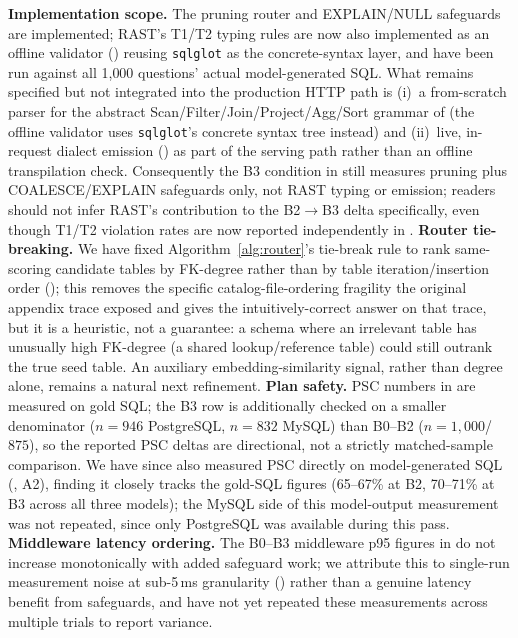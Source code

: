 \documentclass[twocolumn]{svjour3}
\begin{document}
\textbf{Implementation scope.} The pruning router and EXPLAIN/NULL safeguards are implemented; RAST's T1/T2 typing rules are now also implemented as an offline validator () reusing \texttt{sqlglot} as the concrete-syntax layer, and have been run against all 1{,}000 questions' actual model-generated SQL. What remains specified but not integrated into the production HTTP path is (i)~a from-scratch parser for the abstract Scan/Filter/Join/Project/Agg/Sort grammar of  (the offline validator uses \texttt{sqlglot}'s concrete syntax tree instead) and (ii)~live, in-request dialect emission () as part of the serving path rather than an offline transpilation check. Consequently the B3 condition in  still measures pruning plus COALESCE/EXPLAIN safeguards only, not RAST typing or emission; readers should not infer RAST's contribution to the B2$\to$B3 delta specifically, even though T1/T2 violation rates are now reported independently in .
\textbf{Router tie-breaking.} We have fixed Algorithm~\ref{alg:router}'s tie-break rule to rank same-scoring candidate tables by FK-degree rather than by table iteration/insertion order (); this removes the specific catalog-file-ordering fragility the original appendix trace exposed and gives the intuitively-correct answer on that trace, but it is a heuristic, not a guarantee: a schema where an irrelevant table has unusually high FK-degree (a shared lookup/reference table) could still outrank the true seed table. An auxiliary embedding-similarity signal, rather than degree alone, remains a natural next refinement.
\textbf{Plan safety.} PSC numbers in  are measured on gold SQL; the B3 row is additionally checked on a smaller denominator ($n{=}946$ PostgreSQL, $n{=}832$ MySQL) than B0--B2 ($n{=}1{,}000$/$875$), so the reported PSC deltas are directional, not a strictly matched-sample comparison. We have since also measured PSC directly on model-generated SQL (, A2), finding it closely tracks the gold-SQL figures (65--67\% at B2, 70--71\% at B3 across all three models); the MySQL side of this model-output measurement was not repeated, since only PostgreSQL was available during this pass.
\textbf{Middleware latency ordering.} The B0--B3 middleware p95 figures in  do not increase monotonically with added safeguard work; we attribute this to single-run measurement noise at sub-5\,ms granularity () rather than a genuine latency benefit from safeguards, and have not yet repeated these measurements across multiple trials to report variance.
\end{document}
